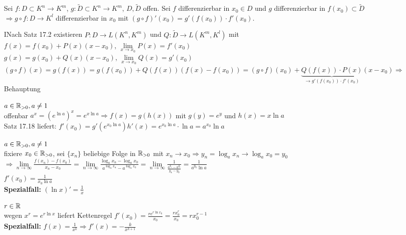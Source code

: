 	\begin{satz}[Kettenregel]
		Sei $f:D\subset K^n\to K^m$, $g:\tilde{D}\subset K^n\to K^m$, $D,\tilde D$ offen. Sei $f$ 
		differenzierbar in $x_0\in D$ und $g$ differenzierbar in $f(x_0)\subset \tilde D$ \\
		$\Rightarrow g\circ f:D\to K^l$ differenzierbar in $x_0$ mit $(g\circ f)'(x_0)=g'(f(x_0))\cdot 
		f'(x_0)$. 
	\end{satz}
	\begin{beweis}
		INach Satz 17.2 existieren $P:D\to L(K^n,K^m)$ und $Q:\tilde{D}\to L(K^m,K^l)$ mit \\
		$f(x)=f(x_0)+P(x)(x-x_0)$, $\lim\limits_{x\to x_0}P(x)=f'(x_0)$ \\
		$g(x)=g(x_0)+Q(x)(x-x_0)$, $\lim\limits_{x\to x_0}Q(x)=g'(x_0)$ \\
		$(g\circ f)(x)=g(f(x))=g(f(x_0))+Q(f(x))(f(x)-f(x_0))=(g\circ f)(x_0)+\underbrace{Q(f(x))\cdot P(x)}
		_{\to g'(f(x_0))\cdot f'(x_0)}(x-x_0)\Rightarrow$ Behauptung
	\end{beweis}

	\begin{beispiel}[$f:\real\to\real$ mit $f(x)=a^x$]
		$a\in\mathbb{R}_{>0}, a\neq 1$ \\
		offenbar $a^x=\left( e^{\ln a} \right)^x=e^{x\ln a}\Rightarrow f(x)=g(h(x))$ mit $g(y)=e^y$ und 
		$h(x)=x\ln a$ \\
		Satz 17.18 liefert: $f'(x_0)=g'\left( e^{x_0\ln a}\right)h'(x)=e^{x_0\ln a}\cdot \ln a=a^{x_0}\ln a$
	\end{beispiel}

	\begin{beispiel}[$f:\real_{>0}\to \real$ mit $f(x)=\log_a x$]
		$a\in\mathbb{R}_{>0}, a\neq 1$ \\
		fixiere $x_0\in \mathbb{R}_{>0}$, sei $\{x_n\}$ beliebige Folge in $\mathbb{R}_{>0}$ mit $x_n\to x_0\Rightarrow
		y_n = \log_a x_n\to \log_a x_0 = y_0$ \\
		$\Rightarrow \lim\limits_{n\to \infty} \frac{f(x_n)-f(x_0)}{x_n-x_0}=\lim\limits_{n\to\infty} 
		\frac{\log_a x_n - \log_a x_0}{a^{\log_a x_n}-a^{\log_a x_0}}=\lim\limits_{n\to\infty}\frac{1}
		{\frac{a^{y_n}-a^{y_0}}{y_n-y_0}}=\frac{1}{a^{y_0}\ln a}$ \\
		$f'(x_0)=\frac{1}{x_0\ln a}$ \\
		\textbf{Spezialfall:} $(\ln x)'=\frac{1}{x}$
	\end{beispiel}

	\begin{beispiel}[$f:\real_{>0}\to\real$ mit $f(x)=x^r$]
		$r\in \mathbb{R}$ \\
		wegen $x^r=e^{r\ln x}$ liefert Kettenregel $f'(x_0)=\frac{re^{r\ln x_0}}{x_0}=\frac{rx_0^r}{x_0}=
		rx_0^{r-1}$ \\
		\textbf{Spezialfall:} $f(x)=\frac{1}{x^k}\Rightarrow f'(x)=-\frac{k}{x^{k+1}}$
	\end{beispiel}


